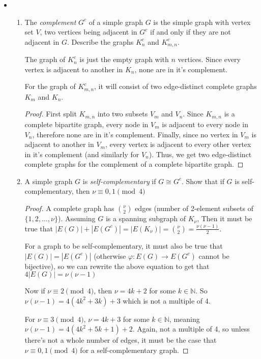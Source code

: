 \documentclass[11pt]{article}
\newcommand\itm[1]{\item[\textbf{#1}]}
\newcommand{\n}{\vspace{0.5cm}}
\begin{document}
\begin{itemize}
  \itm{1.2.11} \begin{enumerate}[label=(\alph*)]
      \item The \textit{complement} \(G^c\) of a simple graph \(G\) is the simple graph with vertex set \(V\), two vertices being adjacent in \(G^c\) if and only if they are not adjacent in \(G\). Describe the graphs \(K^c_n\) and \(K^c_{m,n}\). \n

        The graph of \(K_n^c\) is just the empty graph with \(n\) vertices.  Since every vertex is adjacent to another in \(K_n\), none are in it's complement. \n

        For the graph of \(K_{m,n}^c\), it will consist of two edge-distinct complete graphs \(K_m\) and \(K_n\).  
        \begin{proof}
          First split \(K_{m,n}\) into two subsets \(V_m\) and \(V_n\).  Since \(K_{m,n}\) is a complete bipartite graph, every node in \(V_m\) is adjacent to every node in \(V_n\), therefore none are in it's complement.  Finally, since no vertex in \(V_m\) is adjacent to another in \(V_m\), every vertex is adjacent to every other vertex in it's complement (and similarly for \(V_n\)).  Thus, we get two edge-distinct complete graphs for the complement of a complete bipartite graph.
        \end{proof}

      \item A simple graph \(G\) is \textit{self-complementary} if \(G \cong G^c\). Show that if \(G\) is self-complementary, then \(\nu \equiv 0,1 \pmod 4\)
        \begin{proof}
          A complete graph has \(\displaystyle\binom\nu2\) edges (number of 2-element subsets of \(\{1,2,\hdots,\nu\}\)).  Assuming \(G\) is a spanning subgraph of \(K_\nu\), Then it must be true that \(|E(G)| + |E(G^c)| = |E(K_\nu)| = \displaystyle\binom\nu2 = \frac{\nu(\nu-1)}{2}\).

          For a graph to be self-complementary, it must also be true that \(|E(G)| = |E(G^c)|\) (otherwise \(\varphi \colon E(G) \to E(G^c)\) cannot be bijective), so we can rewrite the above equation to get that \(4|E(G)| = \nu(\nu-1)\)

          Now if \(\nu \equiv 2 \pmod 4\), then \(\nu = 4k+2\) for some \(k \in \mathbb{N}\). So \(\nu(\nu-1) = 4(4k^2 + 3k) + 3\) which is not a multiple of 4.

          For \(\nu \equiv 3 \pmod 4\), \(\nu = 4k+3\) for some \(k \in \mathbb{N}\), meaning \(\nu(\nu-1) = 4(4k^2 + 5k + 1) + 2\).  Again, not a multiple of 4, so unless there's not a whole number of edges, it must be the case that \(\nu \equiv 0,1 \pmod 4\) for a self-complementary graph.
        \end{proof}
    \end{enumerate}




\end{itemize}
\end{document}
